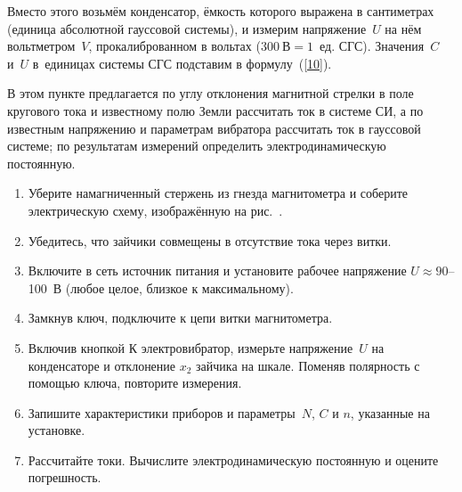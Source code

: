 Вместо этого возьмём конденсатор, ёмкость которого выражена в сантиметрах (единица абсолютной гауссовой системы), и
измерим напряжение~$U$ на нём вольтметром~$V$, прокалиброванном в вольтах ($300~В = 1$~ед. СГС). Значения~$C$ и~$U$
в~единицах системы СГС подставим в формулу~(\eqref{10}).

\begin{lab:task}

    В этом пункте предлагается по углу отклонения магнитной стрелки в поле кругового тока и известному полю Земли рассчитать
    ток в системе СИ, а по известным напряжению и параметрам вибратора рассчитать ток в гауссовой системе; по результатам
    измерений определить электродинамическую постоянную.

    \begin{enumerate}
        \item Уберите намагниченный стержень из гнезда магнитометра и соберите электрическую схему, изображённую на рис.~.

        \item Убедитесь, что зайчики совмещены в отсутствие тока через витки.

        \item Включите в сеть источник питания и установите рабочее напряжение $U\approx 90$--100~В (любое целое, близкое к
        максимальному).

        \item Замкнув ключ, подключите к цепи витки магнитометра.

        \item Включив кнопкой К электровибратор, измерьте напряжение~$U$ на конденсаторе и отклонение $x_2$ зайчика на шкале.
        Поменяв полярность с помощью ключа, повторите измерения.

        \item Запишите характеристики приборов и параметры~$N$, $C$ и $n$, указанные на установке.

        \item Рассчитайте токи. Вычислите электродинамическую постоянную и оцените погрешность.
    \end{enumerate}


\end{lab:task}


